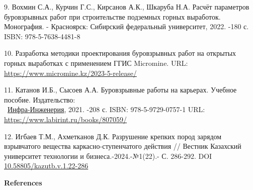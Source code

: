 \begin{references}
9. Вохмин С.А., Курчин Г.С., Кирсанов А.К., Шкаруба Н.А. Расчёт
  параметров буровзрывных работ при строительстве подземных горных
  выработок. Монография. - Красноярск: Сибирский федеральный
  университет, 2022. -180 с. ISBN: 978-5-7638-4481-8

10. Разработка методики проектирования буровзрывных работ на открытых
  горных выработках с применением ГГИС Micromine. URL:
  \url{https://www.micromine.kz/2023-5-release/}

11. Катанов И.Б., Сысоев А.А. Буровзрывные работы на карьерах. Учебное
  пособие.   Издательство:\\~\href{https://www.labirint.ru/pubhouse/2357/}{Инфра-Инженерия},
  2021. -208 с. ISBN: 978-5-9729-0757-1 URL:   \url{https://www.labirint.ru/books/807059/}

12. Игбаев Т.М., Ахметканов Д.К. Разрушение крепких пород зарядом
взрывчатого вещества каркасно-ступенчатого действия // Вестник Казахский
университет технологии и бизнеса.-2024.-№1(22).- С. 286-292. DOI
\href{https://doi.org/10.58805/kazutb.v.1.22-286}{10.58805/kazutb.v.1.22-286}

\end{references}

\begin{center}
{\bfseries References}
\end{center}

